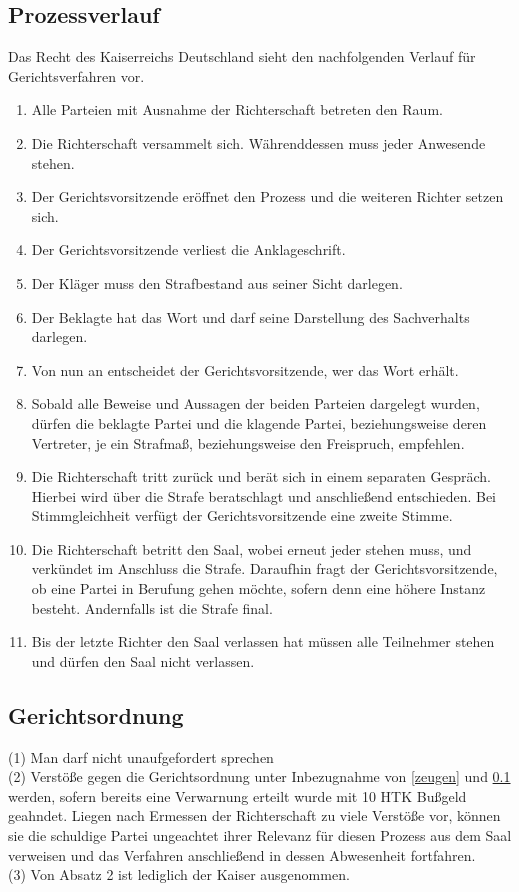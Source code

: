 \documentclass{article}
\begin{document}
\subsection{Prozessverlauf}\label{verlauf}
Das Recht des Kaiserreichs Deutschland sieht den nachfolgenden Verlauf für Gerichtsverfahren vor.\\
\begin{enumerate}
	\item Alle Parteien mit Ausnahme der Richterschaft betreten den Raum.
	\item Die Richterschaft versammelt sich. Währenddessen muss jeder Anwesende stehen.
	\item Der Gerichtsvorsitzende eröffnet den Prozess und die weiteren Richter setzen sich.
	\item Der Gerichtsvorsitzende verliest die Anklageschrift.
	\item Der Kläger muss den Strafbestand aus seiner Sicht darlegen.
	\item Der Beklagte hat das Wort und darf seine Darstellung des Sachverhalts darlegen.
	\item Von nun an entscheidet der Gerichtsvorsitzende, wer das Wort erhält.
	\item Sobald alle Beweise und Aussagen der beiden Parteien dargelegt wurden, dürfen die beklagte Partei und die klagende Partei, beziehungsweise deren Vertreter, je ein Strafmaß, beziehungsweise den Freispruch, empfehlen.
	\item Die Richterschaft tritt zurück und berät sich in einem separaten Gespräch. Hierbei wird über die Strafe beratschlagt und anschließend entschieden. Bei Stimmgleichheit verfügt der Gerichtsvorsitzende eine zweite Stimme.
	\item Die Richterschaft betritt den Saal, wobei erneut jeder stehen muss, und verkündet im Anschluss die Strafe. Daraufhin fragt der Gerichtsvorsitzende, ob eine Partei in Berufung gehen möchte, sofern denn eine höhere Instanz besteht. Andernfalls ist die Strafe final.
	\item Bis der letzte Richter den Saal verlassen hat müssen alle Teilnehmer stehen und dürfen den Saal nicht verlassen.
\end{enumerate}

\subsection{Gerichtsordnung}\label{gordnung}
(1) Man darf nicht unaufgefordert sprechen\\
(2) Verstöße gegen die Gerichtsordnung unter Inbezugnahme von \ref{zeugen} und \ref{verlauf} werden, sofern bereits eine Verwarnung erteilt wurde mit 10 HTK Bußgeld geahndet. Liegen nach Ermessen der Richterschaft zu viele Verstöße vor, können sie die schuldige Partei ungeachtet ihrer Relevanz für diesen Prozess aus dem Saal verweisen und das Verfahren anschließend in dessen Abwesenheit fortfahren.\\
(3) Von Absatz 2 ist lediglich der Kaiser ausgenommen.
\end{document}
